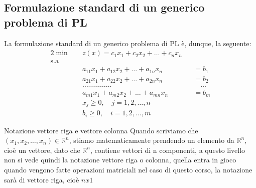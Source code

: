 \subsection{Formulazione standard di un generico problema di PL}
La formulazione standard di un generico problema di PL è, dunque, la seguente:
\begin{alignat}{2}
\min \quad & z(x) = c_1 x_1 + c_2 x_2 + \dots + c_n x_n \nonumber \\[1ex]
\text{s.a} \quad & \nonumber \\[1ex]
& a_{11} x_1 + a_{12} x_2 + \dots + a_{1n} x_n &&= b_1 \tag{1.1} \\
& a_{21} x_1 + a_{22} x_2 + \dots + a_{2n} x_n &&= b_2 \tag{1.2} \\
& \dots\dots\dots\dots\dots && \quad \dots \nonumber \\
& a_{m1} x_1 + a_{m2} x_2 + \dots + a_{mn} x_n &&= b_m \tag{1.$m$} \\
& x_j \ge 0, \quad j = 1, 2, \dots, n \nonumber \\
& b_i \ge 0, \quad i = 1, 2, \dots, m \nonumber
\end{alignat}

\begin{warning}{Notazione vettore riga e vettore colonna}
    Quando scriviamo che $(x_1,x_2,\dots,x_n) \in \mathbb{R}^n$, stiamo matematicamente prendendo un elemento da $\mathbb{R}^n$, cioè un vettore,
    dato che $\mathbb{R}^n$, contiene vettori di n componenti, a questo livello non si vede quindi la notazione vettore riga o colonna, quella entra in gioco quando vengono fatte operazioni matriciali
    nel caso di questo corso, la notazione sarà di vettore riga, cioè $n x 1$
\end{warning}

